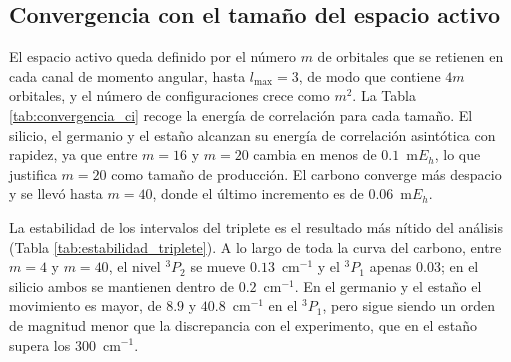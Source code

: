 \subsection{Convergencia con el tamaño del espacio activo}
\label{sec:convergencia_ci}

El espacio activo queda definido por el número $m$ de orbitales que se retienen en cada canal de momento angular, hasta $l_{\max}=3$, de modo que contiene $4m$ orbitales, y el número de configuraciones crece como $m^2$. La Tabla \ref{tab:convergencia_ci} recoge la energía de correlación para cada tamaño. El silicio, el germanio y el estaño alcanzan su energía de correlación asintótica con rapidez, ya que entre $m=16$ y $m=20$ cambia en menos de $0.1$~m$E_h$, lo que justifica $m=20$ como tamaño de producción. El carbono converge más despacio y se llevó hasta $m=40$, donde el último incremento es de $0.06$~m$E_h$.

\begin{table}[htbp]
    \centering
    
    \caption[Energía de correlación de valencia frente al tamaño del espacio activo]{Energía de correlación de valencia en función del número $m$ de orbitales por canal, con $l_{\max}=3$, y número de configuraciones del término $^3P$, común a los cuatro elementos.}
    \label{tab:convergencia_ci}
\end{table}

La estabilidad de los intervalos del triplete es el resultado más nítido del análisis (Tabla \ref{tab:estabilidad_triplete}). A lo largo de toda la curva del carbono, entre $m=4$ y $m=40$, el nivel $^3P_2$ se mueve $0.13$~cm$^{-1}$ y el $^3P_1$ apenas $0.03$; en el silicio ambos se mantienen dentro de $0.2$~cm$^{-1}$. En el germanio y el estaño el movimiento es mayor, de $8.9$ y $40.8$~cm$^{-1}$ en el $^3P_1$, pero sigue siendo un orden de magnitud menor que la discrepancia con el experimento, que en el estaño supera los $300$~cm$^{-1}$.

\begin{table}[htbp]
    \centering
    
    \caption[Estabilidad del triplete frente al tamaño del espacio activo]{Niveles $^3P_1$ y $^3P_2$ (cm$^{-1}$, referidos al $^3P_0$) en el primer y el último tamaño de cada curva de convergencia, frente al NIST.}
    \label{tab:estabilidad_triplete}
\end{table}

